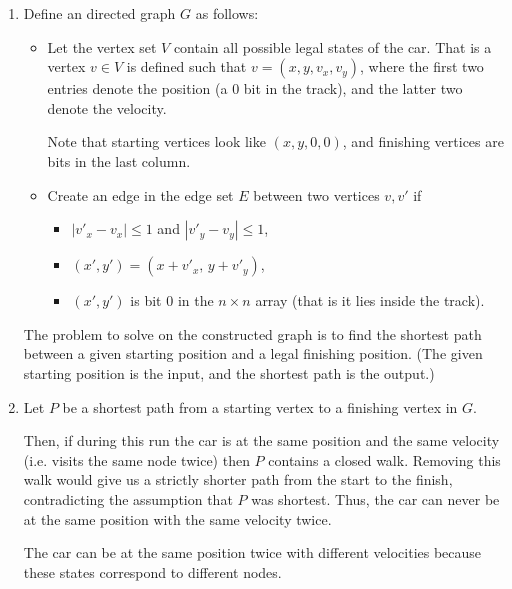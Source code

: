 \documentclass[12pt]{article}
\begin{document}
\begin{solution}
    \bbni 
    \begin{enumerate}
        \item [(a)] Define an directed graph $G$ as follows: 
        \begin{itemize}
            \item Let the vertex set $V$ contain all possible legal states of the car. That is a vertex $v \in V$ is defined such that $v = (x, y, v_x, v_y)$, where the first two entries denote the position (a $0$ bit in the track), and the latter two denote the velocity. 
            
            Note that starting vertices look like $(x,y, 0,0)$, and finishing vertices are bits in the last column.
            \item Create an edge in the edge set $E$ between two vertices $v, v'$ if 
            \begin{itemize}
                \item $|v'_x - v_x| \le 1$ and $|v'_y - v_y| \le 1$,
                \item $(x',y') = (x + v'_x,\, y + v'_y)$,
                \item $(x',y')$ is bit $0$ in the $n \times n$ array (that is it lies inside the track).
            \end{itemize}
        \end{itemize}
        The problem to solve on the constructed graph is to find the shortest path between a given starting position and a legal finishing position. (The given starting position is the input, and the shortest path is the output.)
        \item [(b)] Let $P$ be a shortest path from a starting vertex to a finishing vertex in $G$. 
        
        Then, if during this run the car is at the same position and the same velocity (i.e. visits the same node twice) then $P$ contains a closed walk. Removing this walk would give us a strictly shorter path from the start to the finish, contradicting the assumption that $P$ was shortest. Thus, the car can never be at the same position with the same velocity twice.

        The car can be at the same position twice with different velocities because these states correspond to different nodes. 
    \end{enumerate}
\end{solution}

\newpage
\end{document}
